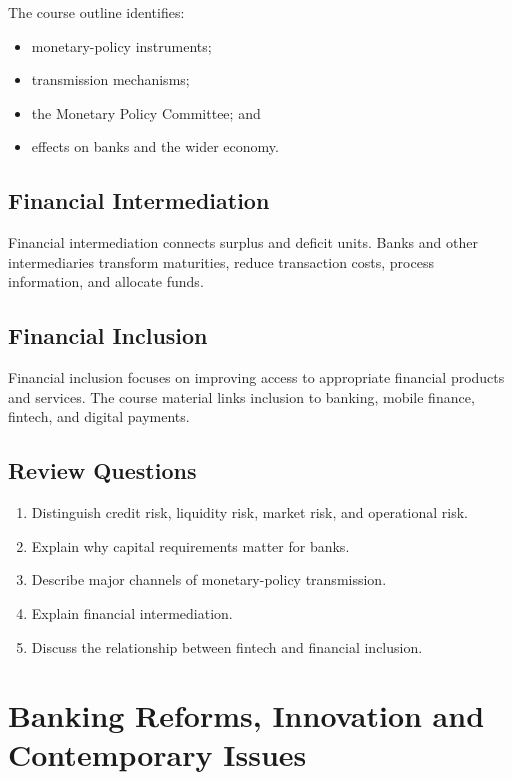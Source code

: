 \documentclass[
]{article}
\providecommand{\tightlist}{%
  \setlength{\itemsep}{0pt}\setlength{\parskip}{0pt}}
\begin{document}
The course outline identifies:

\begin{itemize}
\tightlist
\item
  monetary-policy instruments;
\item
  transmission mechanisms;
\item
  the Monetary Policy Committee; and
\item
  effects on banks and the wider economy.
\end{itemize}

\subsection{Financial Intermediation}\label{financial-intermediation-1}

Financial intermediation connects surplus and deficit units. Banks and other intermediaries transform maturities, reduce transaction costs, process information, and allocate funds.

\subsection{Financial Inclusion}\label{financial-inclusion}

Financial inclusion focuses on improving access to appropriate financial products and services. The course material links inclusion to banking, mobile finance, fintech, and digital payments.

\subsection{Review Questions}\label{review-questions-5}

\begin{enumerate}
\def\labelenumi{\arabic{enumi}.}
\tightlist
\item
  Distinguish credit risk, liquidity risk, market risk, and operational risk.
\item
  Explain why capital requirements matter for banks.
\item
  Describe major channels of monetary-policy transmission.
\item
  Explain financial intermediation.
\item
  Discuss the relationship between fintech and financial inclusion.
\end{enumerate}

\section{Banking Reforms, Innovation and Contemporary Issues}\label{banking-reforms-innovation-and-contemporary-issues}
\end{document}
